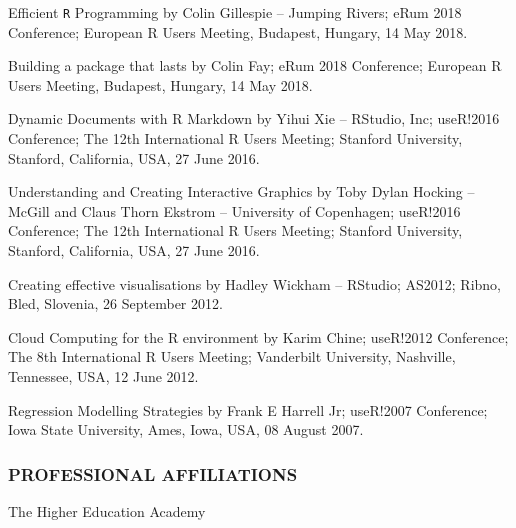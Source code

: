 \documentclass[
]{article}
\begin{document}
Efficient \texttt{R} Programming by Colin Gillespie -- Jumping Rivers;
eRum 2018 Conference; European R Users Meeting, Budapest, Hungary, 14
May 2018.

Building a package that lasts by Colin Fay; eRum 2018 Conference;
European R Users Meeting, Budapest, Hungary, 14 May 2018.

Dynamic Documents with R Markdown by Yihui Xie -- RStudio, Inc;
useR!2016 Conference; The 12th International R Users Meeting; Stanford
University, Stanford, California, USA, 27 June 2016.

Understanding and Creating Interactive Graphics by Toby Dylan Hocking --
McGill and Claus Thorn Ekstrom -- University of Copenhagen; useR!2016
Conference; The 12th International R Users Meeting; Stanford University,
Stanford, California, USA, 27 June 2016.

Creating effective visualisations by Hadley Wickham -- RStudio; AS2012;
Ribno, Bled, Slovenia, 26 September 2012.

Cloud Computing for the R environment by Karim Chine; useR!2012
Conference; The 8th International R Users Meeting; Vanderbilt
University, Nashville, Tennessee, USA, 12 June 2012.

Regression Modelling Strategies by Frank E Harrell Jr; useR!2007
Conference; Iowa State University, Ames, Iowa, USA, 08 August 2007.

\hypertarget{professional-affiliations}{%
\subsubsection{PROFESSIONAL
AFFILIATIONS}\label{professional-affiliations}}

The Higher Education Academy
\end{document}
